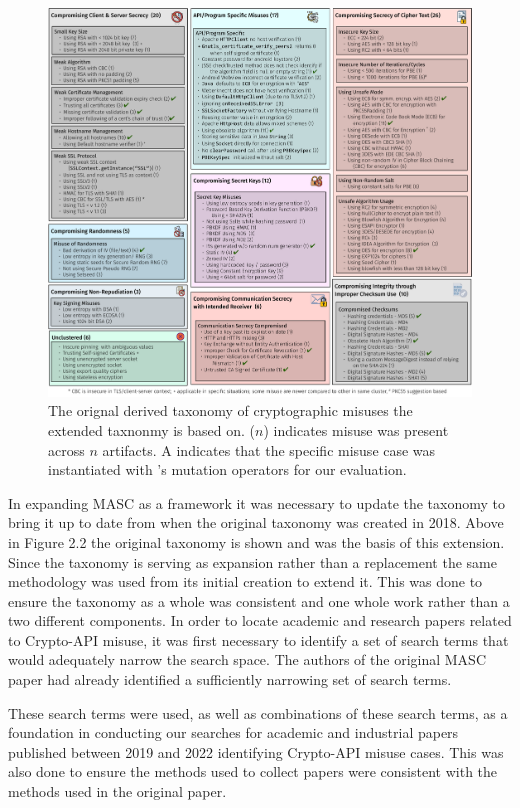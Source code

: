 \begin{figure}[!ht]
	\centering
    \includegraphics[width=0.96\linewidth]{figures/taxonomy.pdf}
	\vspace{-1.em}
    \caption{\small The orignal derived taxonomy of cryptographic misuses the extended taxnonmy is based on. ($n$) indicates misuse was present across $n$ artifacts.  A \checkmark indicates that the specific misuse case was instantiated with \tool's mutation operators for our evaluation.}
    \label{fig:taxonomy}
	
\end{figure}

In expanding MASC as a framework it was necessary to update the taxonomy to bring it up to date from when the original taxonomy was created in 2018. Above in Figure 2.2 the original taxonomy is shown and was the basis of this extension. Since the taxonomy is serving as expansion rather than a replacement the same methodology was used from its initial creation to extend it. This was done to ensure the taxonomy as a whole was consistent and one whole work rather than a two different components. In order to locate academic and research papers related to Crypto-API misuse, it was first necessary to identify a set of search terms that would adequately narrow the search space. The authors of the original MASC paper had already identified a sufficiently narrowing set of search terms. 

These search terms were used, as well as combinations of these search terms, as a foundation in conducting our searches for academic and industrial papers published between 2019 and 2022 identifying Crypto-API misuse cases. This was also done to ensure the methods used to collect papers were consistent with the methods used in the original paper.  

